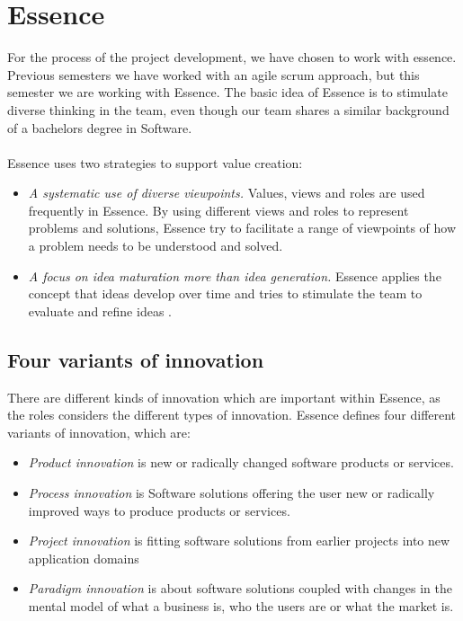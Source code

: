 \section{Essence}
For the process of the project development, we have chosen to work with essence. 
Previous semesters we have worked with an agile scrum approach, but this semester we are working with Essence.
The basic idea of Essence is to stimulate diverse thinking in the team, even though our team shares a similar background of a bachelors degree in Software.
\\\\
Essence uses two strategies to support value creation:
\begin{itemize}
    \item \textit{A systematic use of diverse viewpoints.} 
    Values, views and roles are used frequently in Essence. 
    By using different views and roles to represent problems and solutions, Essence try to facilitate a range of viewpoints of how a problem needs to be understood and solved.
    \item \textit{A focus on idea maturation more than idea generation.}
    Essence applies the concept that ideas develop over time and tries to stimulate the team to evaluate and refine ideas \autocite{Essence}.
\end{itemize}

\subsection{Four variants of innovation}
There are different kinds of innovation which are important within Essence, as the roles considers the different types of innovation. 
Essence defines four different variants of innovation, which are: \autocite{Essense}
\begin{itemize}
    \item \textit{Product innovation} is new or radically changed software products or services. 
    \item \textit{Process innovation} is Software solutions offering the user new or radically improved ways to produce products or services.
    \item \textit{Project innovation} is fitting software solutions from earlier projects into new application domains
    \item \textit{Paradigm innovation} is about software solutions coupled with changes in the mental model of what a business is, who the users are or what the market is.
\end{itemize}

